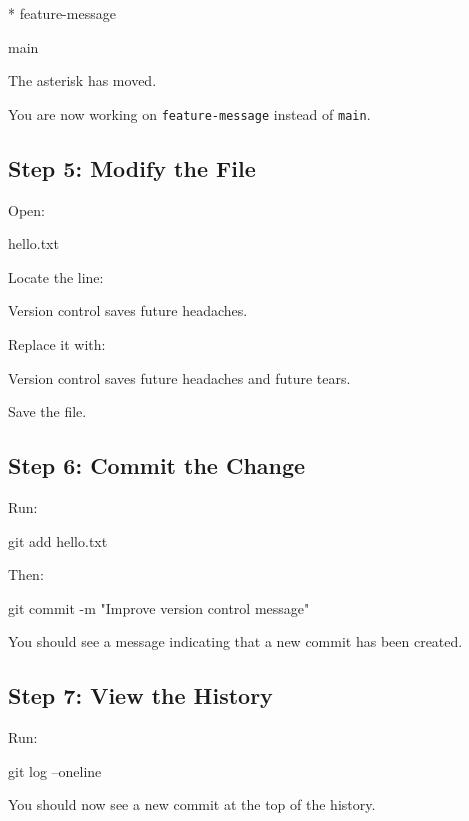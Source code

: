 \documentclass{csc2059practical}
\begin{document}
\begin{terminalplain}
  
  * feature-message
  
  main

\end{terminalplain}

The asterisk has moved.

You are now working on \texttt{feature-message} instead of \texttt{main}.


\subsection{Step 5: Modify the File}
Open:

\begin{terminalplain}
hello.txt
\end{terminalplain}
Locate the line:

\begin{terminalplain}
Version control saves future headaches.
\end{terminalplain}
Replace it with:

\begin{terminalplain}
Version control saves future headaches and future tears.
\end{terminalplain}
Save the file.

\subsection{Step 6: Commit the Change}
Run:

\begin{terminalplain}
git add hello.txt
\end{terminalplain}
Then:

\begin{terminalplain}
git commit -m "Improve version control message"
\end{terminalplain}
You should see a message indicating that a new commit has been created.

\subsection{Step 7: View the History}
Run:

\begin{terminalplain}
git log --oneline
\end{terminalplain}
You should now see a new commit at the top of the history.
\end{document}
